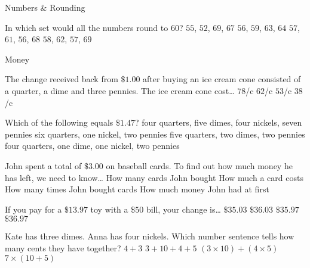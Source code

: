 \documentclass[dvips]{jj_game} %
\def\cents{\hbox{\rm\rlap/c}}
\begin{document}
\begin{Questions}
\begin{Category}{Numbers \& Rounding}
\begin{Question}

In which set would all the numbers round to $60$?
 $55$, $52$, $69$, $67$
 $56$, $59$, $63$, $64$
 $57$, $61$, $56$, $68$
 $58$, $62$, $57$, $69$
\end{Question}

\end{Category}

\begin{Category}{Money}

\begin{Question}

The change received back from $\$1.00$ after buying an ice cream
cone consisted of a quarter, a dime and three pennies.  The ice
cream cone cost\dots
{} $78$\cents
{} $62$\cents
{} $53$\cents
{} $38$\cents
\end{Question}

\begin{Question}

Which of the following equals $\$1.47$?
 four quarters, five dimes, four nickels, seven pennies
 six quarters, one nickel, two pennies
 five quarters, two dimes, two pennies
 four quarters, one dime, one nickel, two pennies
\end{Question}

\begin{Question}

John spent a total of $\$3.00$ on baseball cards.  To find out
how much money he has left, we need to know\dots
{} How many cards John bought
 How much a card costs
 How many times John bought cards
 How much money John had at first
\end{Question}

\begin{Question}

If you pay for a $\$13.97$ toy with a $\$50$ bill, your change
is\dots
{} $\$35.03$
 $\$36.03$
 $\$35.97$
 $\$36.97$
\end{Question}

\begin{Question}

Kate has three dimes.  Anna has four nickels.  Which number sentence tells
how many cents they have together?
 $4+3$
 $3+10+4+5$
 $(3\times 10)+(4\times 5)$
 $7\times(10+5)$
\end{Question}

\end{Category}

\end{Questions}
\end{document}
